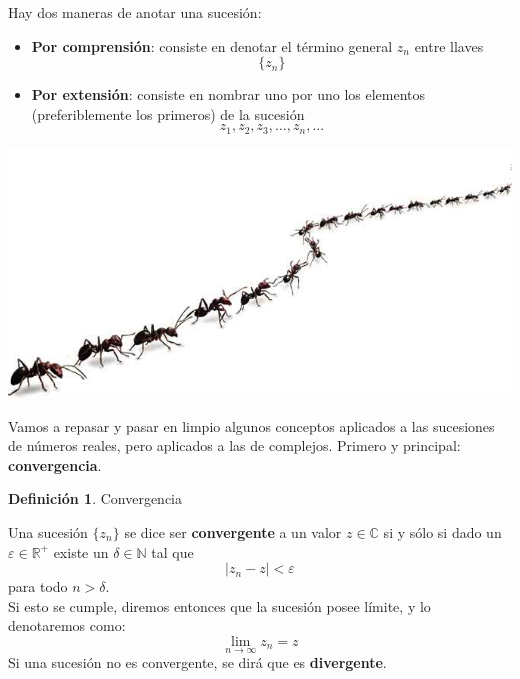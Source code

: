 \documentclass[12pt]{article}
\theoremstyle{definition}
\newtheorem{definition}{Definici\'on}[section]
\theoremstyle{theorem}
\theoremstyle{corolary}
\theoremstyle{method}
\begin{document}
Hay dos maneras de anotar una sucesi\'on:
\begin{itemize}
	\item \textbf{Por comprensi\'on}: consiste en denotar el t\'ermino general $z_n$ entre llaves $$\{z_n\}$$
	\item \textbf{Por extensi\'on}: consiste en nombrar uno por uno los elementos (preferiblemente los primeros) de la sucesi\'on $$z_1, z_2, z_3, ... ,z_n, ...$$
\end{itemize}

\begin{center}
	\includegraphics[scale=0.2]{hormigas2.jpg}
\end{center}

Vamos a repasar y pasar en limpio algunos conceptos aplicados a las sucesiones de n\'umeros reales, pero aplicados a las de complejos. Primero y principal: \textbf{convergencia}.\\

\colorbox{violet!40!white!80}{\parbox{\linewidth}{
\theoremstyle{definition}
\begin{definition}{Convergencia}

Una sucesi\'on $\{z_n\}$ se dice ser \textbf{convergente} a un valor $z \in \mathbb{C}$ si y s\'olo si dado un $\varepsilon \in \mathbb{R}^+$ existe un $\delta \in \mathbb{N}$ tal que $$|z_n-z|<\varepsilon$$ para todo $n>\delta$.\\
Si esto se cumple, diremos entonces que la sucesi\'on posee l\'imite, y lo denotaremos como: $$\lim\limits_{n\rightarrow \infty} z_n = z$$
Si una sucesi\'on no es convergente, se dir\'a que es \textbf{divergente}.

\end{definition}}}
\linebreak
\linebreak
\end{document}
